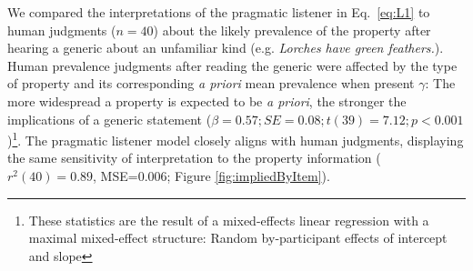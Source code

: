 \documentclass{pnastwo}
\begin{document}
\begin{article}
We compared the interpretations of the pragmatic listener in Eq.~\ref{eq:L1} to human judgments ($n=40$) about the likely prevalence of the property after hearing a generic about an unfamiliar kind (e.g. \emph{Lorches have green feathers.}). %
Human prevalence judgments after reading the generic were affected by the type of property and its corresponding \emph{a priori} mean prevalence when present $\gamma$: The more widespread a property is expected to be \emph{a priori}, the stronger the implications of a generic statement ($\beta = 0.57; SE = 0.08; t(39) = 7.12; p < 0.001$)\footnote{These statistics are the result of a mixed-effects linear regression with a maximal mixed-effect structure: Random by-participant effects of intercept and slope}. 
The pragmatic listener model closely aligns with human judgments, displaying the same sensitivity of interpretation to the property information ($r^2(40)=0.89$, MSE=0.006; Figure \ref{fig:impliedByItem}). 















\end{article}
\end{document}
